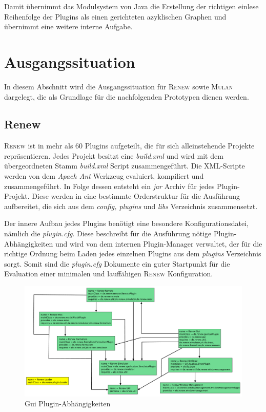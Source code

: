 	Damit übernimmt das Modulsystem von Java die Erstellung der richtigen einlese Reihenfolge der Plugins als einen gerichteten azyklischen Graphen und übernimmt eine weitere interne Aufgabe.

\section{Ausgangssituation} \label{sec:ausgangssituation} 
	In diesem Abschnitt wird die Ausgangssituation für \textsc{Renew} sowie \textsc{Mulan} dargelegt, die als Grundlage für die nachfolgenden Prototypen dienen werden. 

\subsection{Renew} \label{sub:renew}
	\textsc{Renew} ist in mehr als 60 Plugins aufgeteilt, die für sich alleinstehende Projekte repräsentieren. Jedes Projekt besitzt eine \textit{build.xml} und wird mit dem übergeordneten Stamm \textit{build.xml} Script zusammengeführt. Die XML-Scripte werden von dem \textit{Apach Ant} Werkzeug evaluiert, kompiliert und zusammengeführt. In Folge dessen entsteht ein \textit{jar} Archiv für jedes Plugin-Projekt. Diese werden in eine bestimmte Orderstruktur für die Ausführung aufbereitet, die sich aus dem \textit{config, plugins} und \textit{libs} Verzeichnis zusammensetzt. \bigbreak

	Der innere Aufbau jedes Plugins benötigt eine besondere Konfigurationsdatei, nämlich die \textit{plugin.cfg}. Diese beschreibt für die Ausführung nötige Plugin-Abhängigkeiten und wird von dem internen Plugin-Manager verwaltet, der für die richtige Ordnung beim Laden jedes einzelnen Plugins aus dem \textit{plugins} Verzeichnis sorgt. Somit sind die \textit{plugin.cfg} Dokumente ein guter Startpunkt für die Evaluation einer minimalen und lauffähigen \textsc{Renew} Konfiguration. \bigbreak

	\begin{figure}[h!]
	  \centering
	  \includegraphics[width=\textwidth]{material/images/renew_plugin_dependencies2.pdf}
	  \caption{Gui Plugin-Abhängigkeiten}
	  \label{fig:plugin_deps}
	\end{figure}

